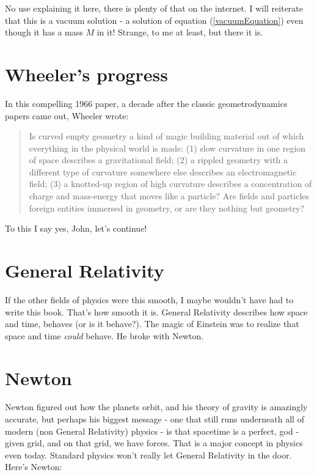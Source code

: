 \documentclass[../rzero]{subfiles}
\begin{document}
No use explaining it here, there is plenty of that on the internet. I will reiterate that this is a vacuum solution - a solution of equation (\ref{vacuumEquation}) even though it has a mass $M$ in it! Strange, to me at least, but there it is.

\section{Wheeler's progress}
In this compelling 1966 paper\cite{wheelerCurvedEmptySpaceTime1966}, a decade after the classic geometrodynamics\cite{Misner:1957mt}\cite{Wheeler1957quantumGeo} papers came out, Wheeler wrote:
\begin{quotation}
	Is curved empty geometry a kind of magic building material out of which everything in the physical world is made: (1) slow curvature in one region of space describes a gravitational field; (2) a rippled geometry with a different type of curvature somewhere else describes an electromagnetic field; (3) a knotted-up region of high curvature describes a concentration of charge and mass-energy that moves like a particle? Are fields and particles foreign entities immersed in geometry, or are they nothing but geometry?
\end{quotation}

To this I say yes, John, let's continue!

\section{General Relativity}
If the other fields of physics were this smooth, I maybe wouldn't have had to write this book. That's how smooth it is. General Relativity describes how space and time, behaves (or is it behave?). The magic of Einstein was to realize that space and time \textit{could} behave. He broke with Newton.


\section{Newton}
Newton figured out how the planets orbit, and his theory of gravity is amazingly accurate, but perhaps his biggest message - one that still runs underneath all of modern (non General Relativity) physics - is that spacetime is a perfect, god - given grid, and on that grid, we have forces. That is a major concept in physics even today. Standard physics won't really let General Relativity in the door. Here's Newton\cite{NewtonsGeneralScholium2013}: 
\end{document}
